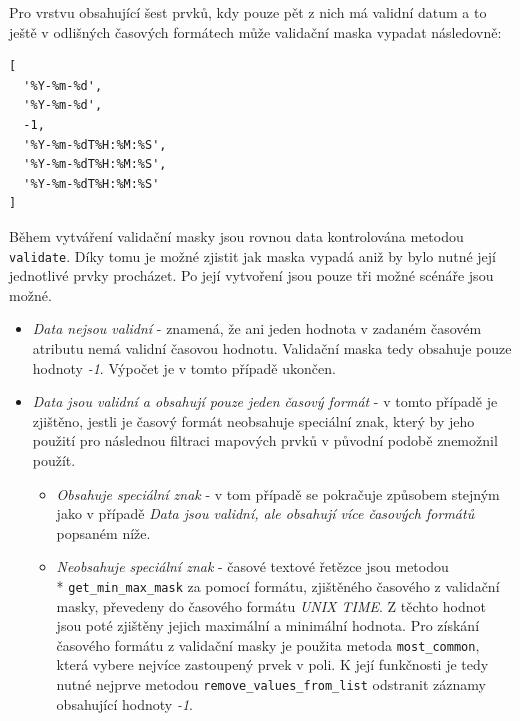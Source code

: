 Pro vrstvu obsahující šest prvků, kdy pouze pět z nich má validní datum a to ještě v odlišných časových formátech může validační maska vypadat následovně:

\begin{verbatim}
[
  '%Y-%m-%d',
  '%Y-%m-%d',
  -1,
  '%Y-%m-%dT%H:%M:%S',
  '%Y-%m-%dT%H:%M:%S',
  '%Y-%m-%dT%H:%M:%S'
]
\end{verbatim}

Během vytváření validační masky jsou rovnou data kontrolována metodou \verb|validate|. Díky tomu je možné zjistit jak maska vypadá aniž by bylo nutné její jednotlivé prvky procházet. Po její vytvoření jsou pouze tři možné scénáře jsou možné.


\begin{itemize}
	\item\textit{Data nejsou validní} - znamená, že ani jeden hodnota v zadaném časovém atributu nemá validní časovou hodnotu. Validační maska tedy obsahuje pouze hodnoty \textit{-1}. Výpočet je v tomto případě ukončen.
	\item\textit{Data jsou validní a obsahují pouze jeden časový formát} - v tomto případě je zjištěno, jestli je časový formát neobsahuje speciální znak, který by jeho použití pro následnou filtraci mapových prvků v původní podobě znemožnil použít.
	\begin{itemize}
		\item\textit{Obsahuje speciální znak} - v tom případě se pokračuje způsobem stejným jako v případě \textit{Data jsou validní, ale obsahují více časových formátů} popsaném níže.
		\item\textit{Neobsahuje speciální znak} - časové textové řetězce jsou metodou \\* \verb|get_min_max_mask| za pomocí formátu, zjištěného časového z validační masky, převedeny do časového formátu \textit{UNIX TIME}. Z těchto hodnot jsou poté zjištěny jejich maximální a minimální hodnota.
		Pro získání časového formátu z validační masky je použita metoda \verb|most_common|, která vybere nejvíce zastoupený prvek v poli. K její funkčnosti je tedy nutné nejprve metodou \verb|remove_values_from_list| odstranit záznamy obsahující hodnoty \textit{-1}.
	\end{itemize}

\end{itemize}
